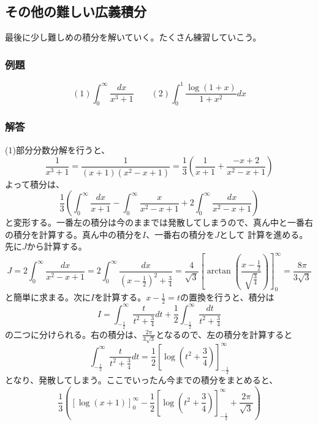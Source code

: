 \documentclass[a4j,dvipdfmx]{jsarticle}
\begin{document}
\subsection{その他の難しい広義積分}
最後に少し難しめの積分を解いていく。たくさん練習していこう。
\subsubsection*{例題}
\begin{equation*}
    (1)\int_0^\infty \frac{dx}{x^3+1}\qquad(2)\int_0^1\frac{\log(1+x)}{1+x^2}dx
\end{equation*}
\subsubsection*{解答}
(1)部分分数分解を行うと、
\begin{equation*}
    \frac{1}{x^3+1}=\frac{1}{(x+1)(x^2-x+1)}=\frac{1}{3}\left(\frac{1}{x+1}+\frac{-x+2}{x^2-x+1}\right)
\end{equation*}
よって積分は、
\begin{equation*}
    \frac{1}{3}\left(\int_0^\infty\frac{dx}{x+1}-\int_0^\infty \frac{x}{x^2-x+1}+2\int_0^\infty\frac{dx}{x^2-x+1}\right)
\end{equation*}
と変形する。一番左の積分は今のままでは発散してしまうので、真ん中と一番右の積分を計算する。真ん中の積分を$I$、一番右の積分を$J$として
計算を進める。先に$J$から計算する。
\begin{equation*}
    J=2\int_0^\infty \frac{dx}{x^2-x+1}=2\int_0^\infty \frac{dx}{(x-\frac{1}{2})^2+\frac{3}{4}}=\frac{4}{\sqrt{3}}\left[\arctan(\frac{x-\frac{1}{2}}{\sqrt{\frac{3}{4}}})\right]_0^\infty =\frac{8\pi}{3\sqrt{3}}
\end{equation*}
と簡単に求まる。次に$I$を計算する。$x-\frac{1}{2}=t$の置換を行うと、積分は  
\begin{equation*}
    I=\int_{-\frac{1}{2}}^\infty \frac{t}{t^2+\frac{3}{4}}dt+\frac{1}{2}\int_{-\frac{1}{2}}^\infty \frac{dt}{t^2+\frac{3}{4}} 
\end{equation*}
の二つに分けられる。右の積分は、$\displaystyle\frac{2\pi}{3\sqrt{3}}$となるので、左の積分を計算すると
\begin{equation*}
    \int_{-\frac{1}{2}}^{\infty}\frac{t}{t^2+\frac{3}{4}}dt=\frac{1}{2}\left[\log(t^2+\frac{3}{4})\right]_{-\frac{1}{2}}^\infty
\end{equation*}
となり、発散してしまう。ここでいったん今までの積分をまとめると、
\begin{equation*}
    \frac{1}{3}\left(\left[\log(x+1)\right]_0^\infty -\frac{1}{2}\left[\log(t^2+\frac{3}{4})\right]_{-\frac{1}{2}}^\infty+\frac{2\pi}{\sqrt{3}}\right)
\end{equation*}
\end{document}
